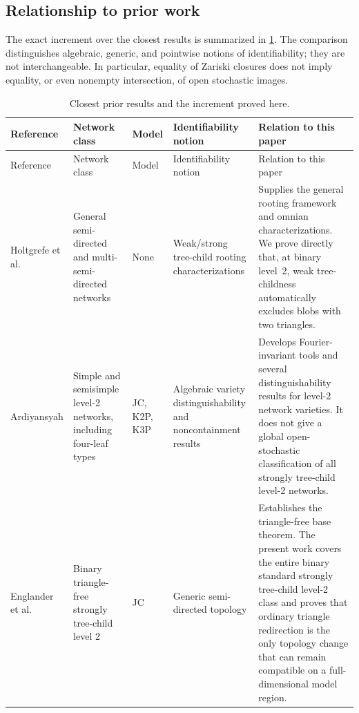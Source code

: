 \subsection{Relationship to prior work}

The exact increment over the closest results is summarized in \cref{tab:prior-work}.  The comparison distinguishes algebraic, generic, and pointwise notions of identifiability; they are not interchangeable.  In particular, equality of Zariski closures does not imply equality, or even nonempty intersection, of open stochastic images.

\begingroup\footnotesize
\setlength{\LTpre}{6pt}
\setlength{\LTpost}{6pt}
\begin{longtable}{@{}>{\raggedright\arraybackslash}p{2.05cm}>{\raggedright\arraybackslash}p{2.45cm}>{\raggedright\arraybackslash}p{1.8cm}>{\raggedright\arraybackslash}p{2.35cm}>{\raggedright\arraybackslash}p{5.5cm}@{}}
\caption{Closest prior results and the increment proved here.}\label{tab:prior-work}\\
\toprule
Reference & Network class & Model & Identifiability notion & Relation to this paper\\
\midrule
\endfirsthead
\toprule
Reference & Network class & Model & Identifiability notion & Relation to this paper\\
\midrule
\endhead
Holtgrefe et al. \cite[Theorem~5 and Corollary~3]{HoltgrefeEtAl2026} & General semi-directed and multi-semi-directed networks & None & Weak/strong tree-child rooting characterizations & Supplies the general rooting framework and omnian characterizations.  We prove directly that, at binary level~2, weak tree-childness automatically excludes blobs with two triangles.\\
Ardiyansyah \cite{Ardiyansyah2021} & Simple and semisimple level-2 networks, including four-leaf types & JC, K2P, K3P & Algebraic variety distinguishability and noncontainment results & Develops Fourier-invariant tools and several distinguishability results for level-2 network varieties.  It does not give a global open-stochastic classification of all strongly tree-child level-2 networks.\\
Englander et al. \cite[Theorem~3.2]{EnglanderEtAl2025} & Binary triangle-free strongly tree-child level 2 & JC & Generic semi-directed topology & Establishes the triangle-free base theorem.  The present work covers the entire binary standard strongly tree-child level-2 class and proves that ordinary triangle redirection is the only topology change that can remain compatible on a full-dimensional model region.\\

\end{longtable}
